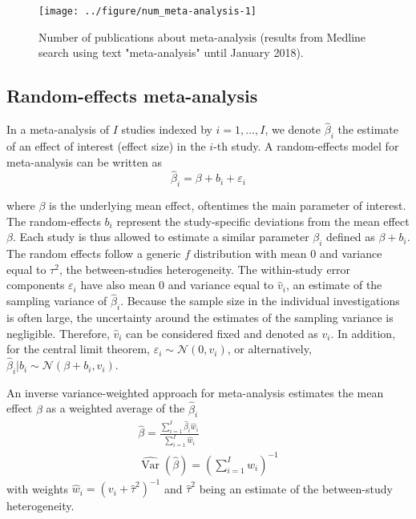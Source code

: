 \documentclass[11pt,a4paper,twoside,openany]{book}\usepackage{knitr}
\DeclareMathOperator{\Var}{Var}
\begin{document}
{\begin{knitrout}\footnotesize
{}\color{fgcolor}\begin{figure}[ht!]

{\centering \texttt{[image: ../figure/num\_meta-analysis-1]} 

}

\caption[Number of publications about meta-analysis (results from Medline search using text "meta-analysis" until January 2018)]{Number of publications about meta-analysis (results from Medline search using text "meta-analysis" until January 2018).}\label{fig:num_meta-analysis}
\end{figure}


\end{knitrout}


\subsection{Random-effects meta-analysis}
\label{sec:rma}

In a meta-analysis of $I$ studies indexed by $i = 1, \dots, I$, we denote $\hat \beta_i$ the estimate of an effect of interest (effect size) in the $i$-th study.
A random-effects model for meta-analysis can be written as
\begin{equation}
\hat \beta_i = \beta + b_i + \varepsilon_i
\label{eq:rma}
\end{equation}

\noindent where $\beta$ is the underlying mean effect, oftentimes the main parameter of interest. The random-effects $b_i$ represent the study-specific deviations from the mean effect $\beta$. Each study is thus allowed to estimate a similar parameter $\beta_i$ defined as $\beta + b_i$. The random effects follow a generic $f$ distribution with mean 0 and variance equal to $\tau^2$, the between-studies heterogeneity. 
The within-study error components $\varepsilon_i$ have also mean 0 and variance equal to $\hat v_i$, an estimate of the sampling variance of $\hat \beta_i$.
Because the sample size in the individual investigations is often large, the uncertainty around the estimates of the sampling variance is negligible. Therefore, $\hat v_i$ can be considered fixed and denoted as $v_i$. In addition, for the central limit theorem, $\varepsilon_i \sim  \mathcal{N}\left(0, v_i \right)$, or alternatively, $\hat \beta_i | b_i \sim \mathcal{N}\left(\beta+b_i, v_i \right)$.

An inverse variance-weighted approach for meta-analysis estimates the mean effect $\beta$ as a weighted average of the $\hat \beta_i$ \citep{whitehead1991general, dersimonian1986meta}
\begin{align}
\hat \beta = \frac{\sum_{i = 1}^I \hat \beta_i \hat w_i}{\sum_{i = 1}^I \hat w_i} \label{eq:avgbeta} \\
\widehat{\Var} \left(\hat \beta \right) = \left( \sum_{i = 1}^I \hat w_i \right)^{-1}
\label{eq:avgvarbeta}
\end{align}
\noindent with weights $\hat w_i = \left(v_i + \hat \tau^2 \right)^{-1}$ and $\hat \tau^2$ being an estimate of the between-study heterogeneity. 


}
\end{document}
